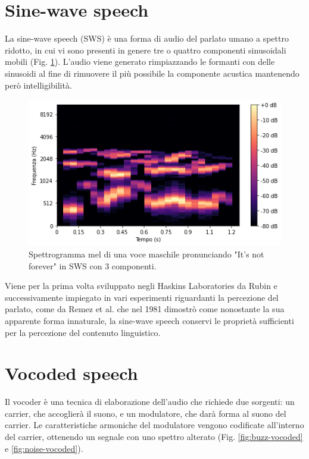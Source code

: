 		\section{Sine-wave speech}
		La sine-wave speech (SWS) è una forma di audio del parlato umano a spettro ridotto, in cui vi sono presenti in genere tre o quattro componenti sinusoidali mobili (Fig. \ref{fig:sine-wave-speech}). L'audio viene generato rimpiazzando le formanti con delle sinusoidi al fine di rimuovere il più possibile la componente acustica mantenendo però intelligibilità.
		\begin{figure}[h]
			\centering
			\includegraphics[width=0.75\linewidth]{figures/sine-wave_speech}
			\caption{Spettrogramma mel di una voce maschile pronunciando "It's not forever" in SWS con 3 componenti.}
			\label{fig:sine-wave-speech}
		\end{figure}
	
		Viene per la prima volta sviluppato negli Haskins Laboratories da Rubin\cite{haskins-laboratories} e successivamente impiegato in vari esperimenti riguardanti la percezione del parlato, come da Remez et al. che nel 1981 dimostrò come nonostante la sua apparente forma innaturale, la sine-wave speech conservi le proprietà sufficienti per la percezione del contenuto linguistico\cite{remez1981speech}.
		
		\section{Vocoded speech}
		Il vocoder è una tecnica di elaborazione dell'audio che richiede due sorgenti: un carrier, che accoglierà il suono, e un modulatore, che darà forma al suono del carrier. Le caratteristiche armoniche del modulatore vengono codificate all'interno del carrier, ottenendo un segnale con uno spettro alterato (Fig. \ref{fig:buzz-vocoded} e \ref{fig:noise-vocoded}).
		
